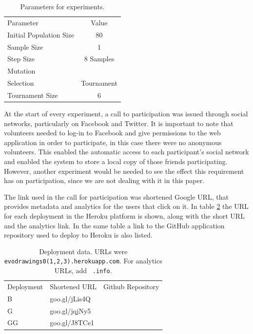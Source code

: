 \documentclass[conference]{IEEEtran}
\begin{document}
\begin{table}
  \small
  \caption{ Parameters for experiments.  }
  \label{tab:params} 
  \centering
  \small
  \begin{tabular}{l  c   }
    \hline\noalign{\smallskip}
     Parameter & Value \\
    \noalign{\smallskip}\hline\noalign{\smallskip}
    Initial Population Size   & 80 \\ \hline
    Sample Size & 1 \\ \hline
    Step Size & 8 Samples \\ \hline
    Mutation &  \\ \hline
    Selection & Tournament \\ \hline
    Tournament Size &  6 \\ \hline
  \end{tabular}
\end{table}

At the start of every experiment, a call to participation was issued
through social networks, 
particularly on Facebook and Twitter.
It is important to note that volunteers needed to log-in to Facebook and give permissions to the 
web application in order to participate, in this case there were no anonymous volunteers. This enabled the automatic access to
each participant's social network and enabled the system to store a local copy of those friends participating.
However, another experiment would be needed to see the effect this
requirement has on participation, since we are not dealing with it in
this paper. 

The link used in the call for participation
was shortened Google URL, that provides metadata and analytics for the
users that click on it. 
In table \ref{tab:urls} the URL for each deployment in the Heroku platform is shown,
along with the short URL and the analytics link. In the same table a link to the GitHub 
application repository used to deploy to Heroku is also listed.    

\begin{table}
  \small
  \caption{ Deployment data. URLs were {\tt
      evodrawings0(1,2,3).herokuapp.com}. For analytics URLs, add {\tt
    .info}.}
  \label{tab:urls} 
  \centering
  \small
  \begin{tabular}{l l l }
    \hline\noalign{\smallskip}
     Deployment &  Shortened URL &  Github Repository \\
    \noalign{\smallskip}\hline\noalign{\smallskip}
    B   & goo.gl/jLis4Q &   \\ \hline
    G   & goo.gl/jqjNy5 &  \\ \hline
    GG  & goo.gl/J8TCe1 &   \\ \hline
    \end{tabular}
\end{table}
\end{document}
